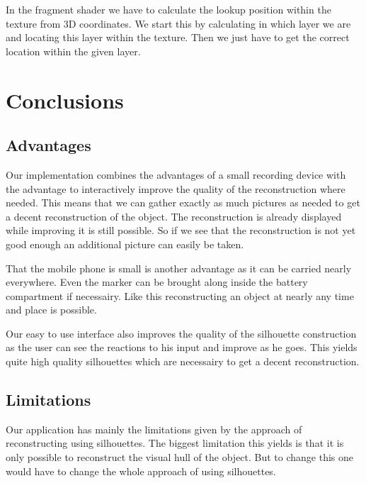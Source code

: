 \documentclass[10pt,twocolumn,letterpaper]{article}
\begin{document}
In the fragment shader we have to calculate the lookup position within the texture from 3D coordinates. We start this by calculating in which layer we are and locating this layer within the texture. Then we just have to get the correct location within the given layer.

\section{Conclusions}

\subsection{Advantages}

Our implementation combines the advantages of a small recording device with the advantage to interactively improve the quality of the reconstruction where needed. This means that we can gather exactly as much pictures as needed to get a decent reconstruction of the object. The reconstruction is already displayed while improving it is still possible. So if we see that the reconstruction is not yet good enough an additional picture can easily be taken.

That the mobile phone is small is another advantage as it can be carried nearly everywhere. Even the marker can be brought along inside the battery compartment if necessairy. Like this reconstructing an object at nearly any time and place is possible.

Our easy to use interface also improves the quality of the silhouette construction as the user can see the reactions to his input and improve as he goes. This yields quite high quality silhouettes which are necessairy to get a decent reconstruction.

\subsection{Limitations}

Our application has mainly the limitations given by the approach of reconstructing using silhouettes. The biggest limitation this yields is that it is only possible to reconstruct the visual hull of the object. But to change this one would have to change the whole approach of using silhouettes.
\end{document}
